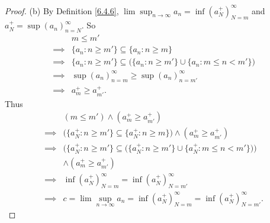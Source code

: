 \begin{proof}{(b)}
    By Definition \ref{6.4.6}, \(\lim\sup_{n \to \infty} a_n = \inf(a_N^+)_{N = m}^\infty\) and \(a_N^+ = \sup(a_n)_{n = N}^\infty\).
    So
    \begin{align*}
                 & m \leq m'                                                                                \\
        \implies & \{a_n : n \geq m'\} \subseteq \{a_n : n \geq m\}                                         \\
        \implies & \{a_n : n \geq m'\} \subseteq \big(\{a_n : n \geq m'\} \cup \{a_n : m \leq n < m'\}\big) \\
        \implies & \sup(a_n)_{n = m}^\infty \geq \sup(a_n)_{n = m'}^\infty                                  \\
        \implies & a_m^+ \geq a_{m'}^+.
    \end{align*}
    Thus
    \begin{align*}
                 & (m \leq m') \land (a_m^+ \geq a_{m'}^+)                                                                    \\
        \implies & \big(\{a_N^+ : n \geq m'\} \subseteq \{a_N^+ : n \geq m\}\big) \land (a_m^+ \geq a_{m'}^+)                 \\
        \implies & \bigg(\{a_N^+ : n \geq m'\} \subseteq \big(\{a_N^+ : n \geq m'\} \cup \{a_N^+ : m \leq n < m'\}\big)\bigg) \\
                 & \land (a_m^+ \geq a_{m'}^+)                                                                                \\
        \implies & \inf(a_N^+)_{N = m}^\infty = \inf(a_N^+)_{N = m'}^\infty                                                   \\
        \implies & c = \lim\sup_{n \to \infty} a_n = \inf(a_N^+)_{N = m}^\infty = \inf(a_N^+)_{N = m'}^\infty.
    \end{align*}
\end{proof}

